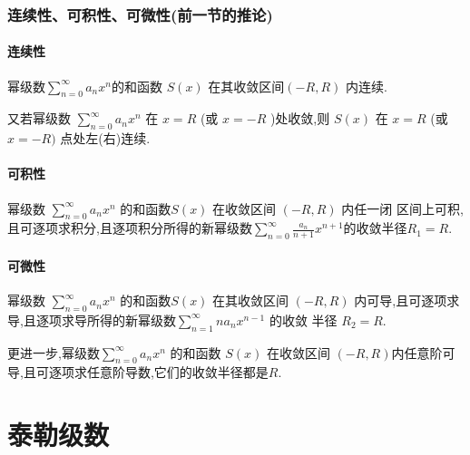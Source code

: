 \documentclass[UTF8]{ctexart}
\begin{document}
\subsubsection{连续性、可积性、可微性(前一节的推论)}
\begin{tcolorbox}[colframe=green!66!black]
\paragraph{连续性}幂级数$\sum_{n=0}^{\infty}a_{n}x^{n}$的和函数 $S(x)$ 在其收敛区间$(-R, R)$ 内连续.

又若幂级数 $\sum_{n=0}^{\infty} a_{n} x^{n}$ 在 $x=R$ (或 $x=-R$ )处收敛,则 $S(x)$ 在 $x=R$ (或 $x=-R)$ 点处左(右)连续.
\tcbline
\paragraph{可积性}幂级数 $\sum_{n=0}^{\infty} a_{n} x^{n}$ 的和函数$S(x)$ 在收敛区间 $(-R, R)$ 内任一闭 区间上可积,且可逐项求积分,且逐项积分所得的新幂级数$\sum_{n=0}^{\infty} \frac{a_{n}}{n+1} x^{n+1}$的收敛半径$R_{1}=R$.
\tcbline
\paragraph{可微性}幂级数 $\sum_{n=0}^{\infty} a_{n} x^{n}$ 的和函数$S(x)$ 在其收敛区间 $(-R, R)$ 内可导,且可逐项求导,且逐项求导所得的新幂级数$\sum_{n=1}^{\infty}na_{n} x^{n-1}$ 的收敛 半径 $R_{2}=R$.

\qquad 更进一步,幂级数$\sum_{n=0}^{\infty} a_{n} x^{n}$ 的和函数 $S(x)$ 在收敛区间 $(-R, R)$内任意阶可导,且可逐项求任意阶导数,它们的收敛半径都是$R$.
\end{tcolorbox}

\newpage
\section{泰勒级数}
\end{document}
